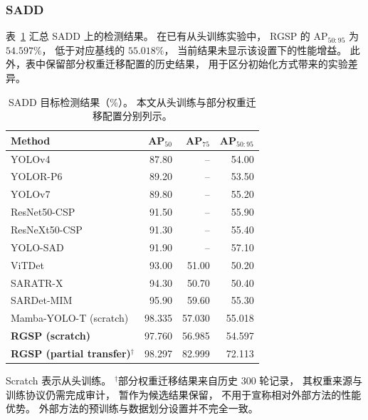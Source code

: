 \documentclass[journal]{IEEEtran}
\begin{document}
\subsubsection{SADD}
\label{sec:sadd_results}

表~\ref{tab:sadd_comparison}
汇总 SADD 上的检测结果。
在已有从头训练实验中，
RGSP 的 AP$_{50:95}$ 为 $54.597\%$，
低于对应基线的 $55.018\%$，
当前结果未显示该设置下的性能增益。
此外，表中保留部分权重迁移配置的历史结果，
用于区分初始化方式带来的实验差异。

\begin{table}[!t]
\centering
\small
\setlength{\tabcolsep}{5pt}
\caption{SADD 目标检测结果（\%）。
本文从头训练与部分权重迁移配置分别列示。}
\label{tab:sadd_comparison}
\begin{tabular*}{\textwidth}{@{\extracolsep{\fill}}lrrr}
\toprule
Method & AP$_{50}$ & AP$_{75}$ & AP$_{50:95}$ \\
\midrule
YOLOv4            & 87.80 & --    & 54.00 \\
YOLOR-P6          & 89.20 & --    & 53.50 \\
YOLOv7            & 89.80 & --    & 55.20 \\
ResNet50-CSP      & 91.50 & --    & 55.90 \\
ResNeXt50-CSP     & 91.30 & --    & 55.40 \\
YOLO-SAD          & 91.90 & --    & 57.10 \\
ViTDet            & 93.00 & 51.00 & 50.20 \\
SARATR-X          & 94.30 & 50.70 & 50.40 \\
SARDet-MIM        & 95.90 & 59.60 & 55.30 \\
\midrule
Mamba-YOLO-T (scratch)
                  & 98.335 & 57.030 & 55.018 \\
\textbf{RGSP (scratch)}
                  & 97.760 & 56.985 & 54.597 \\
\textbf{RGSP (partial transfer)}$^{\dagger}$
                  & 98.297 & 82.999 & 72.113 \\
\bottomrule
\end{tabular*}

\smallskip
\begin{minipage}{\linewidth}
\footnotesize
Scratch 表示从头训练。
$^{\dagger}$部分权重迁移结果来自历史 300 轮记录，
其权重来源与训练协议仍需完成审计，
暂作为候选结果保留，
不用于宣称相对外部方法的性能优势。
外部方法的预训练与数据划分设置并不完全一致。
\end{minipage}
\end{table}
\end{document}

